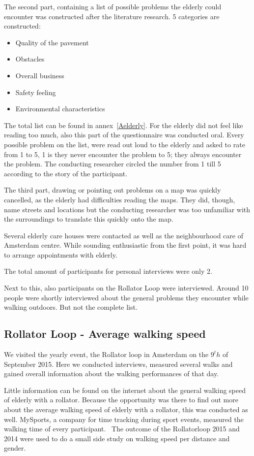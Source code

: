 The second part, containing a list of possible problems the elderly could encounter was constructed after the literature research. 5 categories are constructed:

\begin{itemize}
\item Quality of the pavement
\item Obstacles
\item Overall business
\item Safety feeling
\item Environmental characteristics
\end{itemize}

The total list can be found in annex~\ref{Aelderly}. For the elderly did not feel like reading too much, also this part of the questionnaire was conducted oral. Every possible problem on the list, were read out loud to the elderly and asked to rate from 1 to 5, 1 is they never encounter the problem to 5; they always encounter the problem. The conducting researcher circled the number from 1 till 5 according to the story of the participant. 

The third part, drawing or pointing out problems on a map was quickly cancelled, as the elderly had difficulties reading the maps. They did, though, name streets and locations but the conducting researcher was too unfamiliar with the surroundings to translate this quickly onto the map. 

Several elderly care houses were contacted as well as the neighbourhood care of Amsterdam centre. While sounding enthusiastic from the first point, it was hard to arrange appointments with elderly. 

The total amount of participants for personal interviews were only 2. 

Next to this, also participants on the Rollator Loop were interviewed. Around 10 people were shortly interviewed about the general problems they encounter while walking outdoors. But not the complete list. 

\subsection{Rollator Loop - Average walking speed}
We visited the yearly event, the Rollator loop in Amsterdam on the $9^th$ of September 2015. Here we conducted interviews, measured several walks and gained overall information about the walking performances of that day. 

Little information can be found on the internet about the general walking speed of elderly with a rollator. Because the opportunity was there to find out more about the average walking speed of elderly with a rollator, this was conducted as well. MySports, a company for time tracking during sport events, measured the walking time of every participant.~\cite{mysports} The outcome of the Rollatorloop 2015 and 2014 were used to do a small side study on walking speed per distance and gender. 